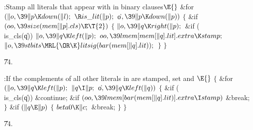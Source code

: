 \B{}:Stamp all literals that appear with  in
binary clauses\X${}\E{}$\6
\&{for} ${}(\|o,\39\|p\K\\{down}(\|l);{}$ ${}\R\\{is\_lit}(\|p);{}$ \|o${},\39%
\|p\K\\{down}(\|p)){}$\5
${}\{{}$\1\6
\&{if} ${}(\\{oo},\39\\{size}(\\{mem}[\|p].\\{cls})\E\T{2}){}$\5
${}\{{}$\1\6
${}\|o,\39\|q\K\\{right}(\|p);{}$\6
\&{if} (\\{is\_cls}(\|q))\1\5
${}\|o,\39\|q\K\\{left}(\|p);{}$\2\6
${}\\{oo},\39\\{lmem}[\\{mem}[\|q].\\{lit}].\\{extra}\K\\{stamp};{}$\6
${}\|o,\39\\{stbits}\MRL{{\OR}{\K}}\\{litsig}(\\{bar}(\\{mem}[\|q].%
\\{lit}));{}$\6
\4${}\}{}$\2\6
\4${}\}{}$\2\par
\U74.\fi

\B{}:If the complements of all other literals in 
are stamped, set  and \X${}\E{}$\6
${}\{{}$\1\6
\&{for} ${}(\|o,\39\|q\K\\{left}(\|p);{}$ ${}\|q\I\|p;{}$ \|o${},\39\|q\K%
\\{left}(\|q)){}$\5
${}\{{}$\1\6
\&{if} (\\{is\_cls}(\|q))\1\5
\&{continue};\2\6
\&{if} ${}(\\{oo},\39\\{lmem}[\\{bar}(\\{mem}[\|q].\\{lit})].\\{extra}\I%
\\{stamp}){}$\1\5
\&{break};\2\6
\4${}\}{}$\2\6
\&{if} ${}(\|q\E\|p){}$\5
${}\{{}$\1\6
${}\\{beta0}\K\|c;{}$\6
\&{break};\6
\4${}\}{}$\2\6
\4${}\}{}$\2\par
\U74.\fi

